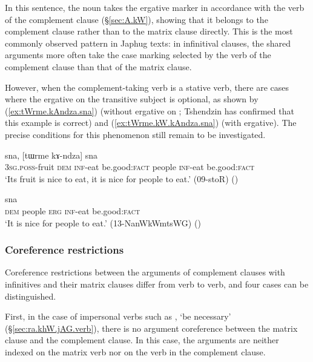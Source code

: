 In this sentence, the noun takes the ergative marker  in accordance with the verb of the complement clause (§\ref{sec:A.kW}), showing that it belongs to the complement clause rather than to the matrix clause directly. This is the most commonly observed pattern in Japhug texts: in infinitival clauses, the shared arguments more often take the case marking selected by the verb of the complement clause than that of the matrix clause.

However, when the complement-taking verb is a stative verb, there are cases where the ergative on the transitive subject is optional, as shown by (\ref{ex:tWrme.kAndza.sna}) (without ergative on ; Tshendzin has confirmed that this example is correct) and (\ref{ex:tWrme.kW.kAndza.sna}) (with ergative). The precise conditions for this phenomenon still remain to be investigated.

\begin{exe}
\ex \label{ex:tWrme.kAndza.sna}
 sna, [tɯrme kɤ-ndza] sna \\
\textsc{3sg}.\textsc{poss}-fruit \textsc{dem} \textsc{inf}-eat be.good:\textsc{fact} people \textsc{inf}-eat be.good:\textsc{fact} \\
\glt `Its fruit is nice to eat, it is nice for people to eat.' (09-stoR)
()
\end{exe}

\begin{exe}
\ex \label{ex:tWrme.kW.kAndza.sna}
 sna \\
\textsc{dem} people \textsc{erg} \textsc{inf}-eat be.good:\textsc{fact} \\
\glt `It is nice for people to eat.' (13-NanWkWmtsWG)
()
\end{exe}

\subsubsection{Coreference restrictions} \label{sec:velar.inf.coreference}
Coreference restrictions between the arguments of complement clauses with  infinitives and their matrix clauses differ from verb to verb, and four cases can be distinguished.

First, in the case of impersonal verbs such as , `be necessary' (§\ref{sec:ra.khW.jAG.verb}), there is no argument coreference between the matrix clause and the complement clause. In this case, the arguments are neither indexed on the matrix verb nor on the verb in the complement clause.

